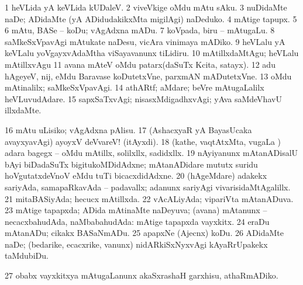 {{{{{{{\noindent
\gl{\pagu}
\expl{}
\bmng
\bnum
\num{1}  heVLida yA keVLida kUDaleV. 
\num{2}  viveVkige oMdu mAtu sAku. 
\num{3}  nuDidaMte naDe; ADidaMte (yA ADidudakikxMta migilAgi) naDeduko. 
\num{4}  mAtige tapupx. 
\num{5}  
\num{6}  mAtu, BASe -- koDu; vAgAdxna mADu. 
\num{7}  koVpada, biru -- mAtugaLu. 
\num{8}  saMkeSxVpavAgi mAtukate naDesu, vicAra vinimaya mADiko. 
\num{9}  heVLalu yA keVLalu yoVgayxvAdaMtha viSayavanunx tiLidiru. 
\num{10}  mAtillxdaMtAgu; heVLalu mAtillxvAgu 
\num{11}  avana mAteV oMdu patarx(daSuTx Kcita, satayx). 
\num{12}  adu hAgeyeV, nij, eMdu Baravase koDutetxVne, parxmAN mADutetxVne. 
\num{13}  oMdu mAtinalilx; saMkeSxVpavAgi. 
\num{14}  athARtf; aMdare; beVre mAtugaLalilx heVLuvudAdare. 
\num{15}  sapxSaTxvAgi; nisasxMdigadhxvAgi; yAva saMdeVhavU illxdaMte. 
\num{16}  mAtu uLisiko; vAgAdxna pAlisu. 
\num{17}  (AshacxyaR yA BayasUcaka avayxyavAgi) ayoyxV deVvareV! (itAyxdi). 
\num{18}  (kathe, vaqtAtxMta, \mo vugaLa \vi) adara bagegx -- oMdu mAtillx, solilxllx, sadidxllx. 
\num{19}  nAyiyanunx mAtanADisalU bAyi biDadaSuTx bigitukoMDidAdxne; mAtanADidare mututx suridu hoVgutatxdeVnoV eMdu tuTi bicacxdidAdxne. 
\num{20} (hAgeMdare) adakekx sariyAda, samapaRkavAda -- padavallx; adanunx sariyAgi vivarisidaMtAgalillx. 
\num{21}  mitaBASiyAda; hecucx mAtillxda. 
\num{22}  vAcALiyAda; vipariVta mAtanADuva. 
\num{23}  mAtige tapapxda; ADida mAtinaMte naDeyuva; (avana) mAtanunx -- necacxbahudAda, naMbabahudAda:  mAtige tapapxda vayxkitx. 
\num{24}  eraDu mAtanADu; cikakx BASaNmADu. 
\num{25}  apapxNe (Ajecnx) koDu. 
\num{26}  ADidaMte naDe; (bedarike, ecacxrike, \mo vanunx) nidARkiSxNyxvAgi kAyaRrUpakekx taMdubiDu. 
\num{27}  obabx vayxkitxya mAtugaLanunx akaSxrashaH garxhisu, athaRmADiko. 
}}}}}}}
